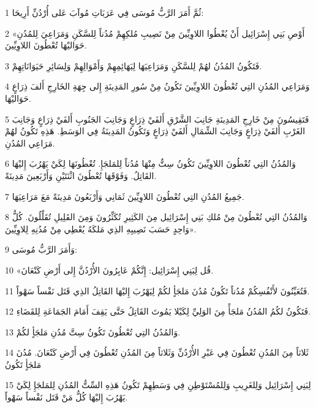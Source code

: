 \par 1 ثُمَّ أَمَرَ الرَّبُّ مُوسَى فِي عَرَبَاتِ مُوآبَ عَلى أُرْدُنِّ أَرِيحَا:
\par 2 «أَوْصِ بَنِي إِسْرَائِيل أَنْ يُعْطُوا اللاوِيِّينَ مِنْ نَصِيبِ مُلكِهِمْ مُدُناً لِلسَّكَنِ وَمَرَاعِيَ لِلمُدُنِ حَوَاليْهَا تُعْطُونَ اللاوِيِّينَ.
\par 3 فَتَكُونُ المُدُنُ لهُمْ لِلسَّكَنِ وَمَرَاعِيَهَا لِبَهَائِمِهِمْ وَأَمْوَالِهِمْ وَلِسَائِرِ حَيَوَانَاتِهِمْ.
\par 4 وَمَرَاعِي المُدُنِ التِي تُعْطُونَ اللاوِيِّينَ تَكُونُ مِنْ سُورِ المَدِينَةِ إِلى جِهَةِ الخَارِجِ أَلفَ ذِرَاعٍ حَوَاليْهَا.
\par 5 فَتَقِيسُونَ مِنْ خَارِجِ المَدِينَةِ جَانِبَ الشَّرْقِ أَلفَيْ ذِرَاعٍ وَجَانِبَ الجَنُوبِ أَلفَيْ ذِرَاعٍ وَجَانِبَ الغَرْبِ أَلفَيْ ذِرَاعٍ وَجَانِبَ الشِّمَالِ أَلفَيْ ذِرَاعٍ وَتَكُونُ المَدِينَةُ فِي الوَسَطِ. هَذِهِ تَكُونُ لهُمْ مَرَاعِي المُدُنِ.
\par 6 وَالمُدُنُ التِي تُعْطُونَ اللاوِيِّينَ تَكُونُ سِتٌّ مِنْهَا مُدُناً لِلمَلجَإِ. تُعْطُونَهَا لِكَيْ يَهْرُبَ إِليْهَا القَاتِلُ. وَفَوْقَهَا تُعْطُونَ اثْنَتَيْنِ وَأَرْبَعِينَ مَدِينَةً.
\par 7 جَمِيعُ المُدُنِ التِي تُعْطُونَ اللاوِيِّينَ ثَمَانِي وَأَرْبَعُونَ مَدِينَةً مَعَ مَرَاعِيَهَا.
\par 8 وَالمُدُنُ التِي تُعْطُونَ مِنْ مُلكِ بَنِي إِسْرَائِيل مِنَ الكَثِيرِ تُكَثِّرُونَ وَمِنَ القَلِيلِ تُقَلِّلُونَ. كُلُّ وَاحِدٍ حَسَبَ نَصِيبِهِ الذِي مَلكَهُ يُعْطِي مِنْ مُدُنِهِ لِلاوِيِّينَ».
\par 9 وَأَمَرَ الرَّبُّ مُوسَى:
\par 10 «قُل لِبَنِي إِسْرَائِيل: إِنَّكُمْ عَابِرُونَ الأُرْدُنَّ إِلى أَرْضِ كَنْعَانَ.
\par 11 فَتُعَيِّنُونَ لأَنْفُسِكُمْ مُدُناً تَكُونُ مُدُنَ مَلجَأٍ لكُمْ لِيَهْرُبَ إِليْهَا القَاتِلُ الذِي قَتَل نَفْساً سَهْواً.
\par 12 فَتَكُونُ لكُمُ المُدُنُ مَلجَأً مِنَ الوَلِيِّ لِكَيْلا يَمُوتَ القَاتِلُ حَتَّى يَقِفَ أَمَامَ الجَمَاعَةِ لِلقَضَاءِ.
\par 13 وَالمُدُنُ التِي تُعْطُونَ تَكُونُ سِتَّ مُدُنِ مَلجَأٍ لكُمْ.
\par 14 ثَلاثاً مِنَ المُدُنِ تُعْطُونَ فِي عَبْرِ الأُرْدُنِّ وَثَلاثاً مِنَ المُدُنِ تُعْطُونَ فِي أَرْضِ كَنْعَانَ. مُدُنَ مَلجَأٍ تَكُونُ
\par 15 لِبَنِي إِسْرَائِيل وَلِلغَرِيبِ وَلِلمُسْتَوْطِنِ فِي وَسَطِهِمْ تَكُونُ هَذِهِ السِّتُّ المُدُنِ لِلمَلجَإِ لِكَيْ يَهْرُبَ إِليْهَا كُلُّ مَنْ قَتَل نَفْساً سَهْواً.
